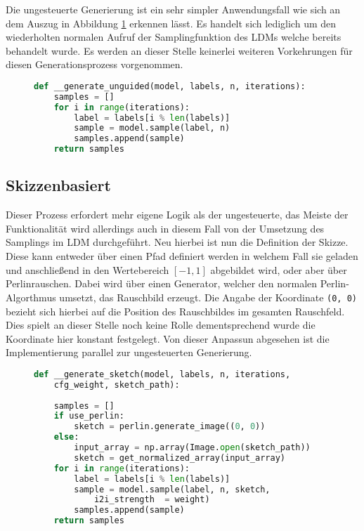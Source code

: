 Die ungesteuerte Generierung ist ein sehr simpler Anwendungsfall wie sich an dem Auszug in Abbildung \ref{fig:gen_unguided} erkennen lässt. Es handelt sich lediglich um den wiederholten normalen Aufruf der Samplingfunktion des \ac{LDM}s welche bereits behandelt wurde. Es werden an dieser Stelle keinerlei weiteren Vorkehrungen für diesen Generationsprozess vorgenommen.   
\begin{figure}[htbp]
\begin{lstlisting}[language=python]
def __generate_unguided(model, labels, n, iterations):
    samples = []
    for i in range(iterations):
        label = labels[i % len(labels)]
        sample = model.sample(label, n)
        samples.append(sample)
    return samples
\end{lstlisting}
    \captionsetup{type=figure}
    \label{fig:gen_unguided}
\end{figure}

\subsection {Skizzenbasiert}

Dieser Prozess erfordert mehr eigene Logik als der ungesteuerte, das Meiste der Funktionalität wird allerdings auch in diesem Fall von der Umsetzung des Samplings im \ac{LDM} durchgeführt. Neu hierbei ist nun die Definition der Skizze. Diese kann entweder über einen Pfad definiert werden in welchem Fall sie geladen und anschließend in den Wertebereich $[-1,1]$ abgebildet wird, oder aber über Perlinrauschen. Dabei wird über einen Generator, welcher den normalen Perlin-Algorthmus umsetzt, das Rauschbild erzeugt. Die Angabe der Koordinate \texttt{(0, 0)} bezieht sich hierbei auf die Position des Rauschbildes im gesamten Rauschfeld. Dies spielt an dieser Stelle noch keine Rolle dementsprechend wurde die Koordinate hier konstant festgelegt. Von dieser Anpassun abgesehen ist die Implementierung parallel zur ungesteuerten Generierung.
\begin{figure}[htbp]
\begin{lstlisting}[language=python]
def __generate_sketch(model, labels, n, iterations,
    cfg_weight, sketch_path):
    
    samples = []
    if use_perlin:
        sketch = perlin.generate_image((0, 0))
    else:
        input_array = np.array(Image.open(sketch_path))
        sketch = get_normalized_array(input_array)
    for i in range(iterations):
        label = labels[i % len(labels)]
        sample = model.sample(label, n, sketch,
            i2i_strength  = weight)
        samples.append(sample)
    return samples
\end{lstlisting}
    \captionsetup{type=figure}
    \label{fig:gen_sketch}
\end{figure}

